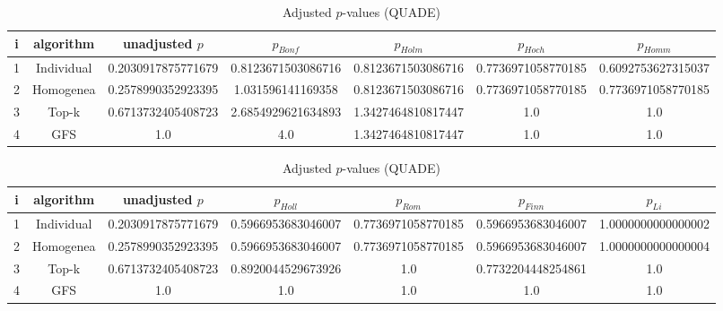 \documentclass[a4paper,10pt]{article}
\begin{document}
\begin{landscape}
\newpage

\begin{table}[!htp]
\centering\scriptsize
\caption{Adjusted $p$-values (QUADE)}
\begin{tabular}{ccccccc}
i&algorithm&unadjusted $p$&$p_{Bonf}$&$p_{Holm}$&$p_{Hoch}$&$p_{Homm}$\\
\hline
1&Individual&0.2030917875771679&0.8123671503086716&0.8123671503086716&0.7736971058770185&0.6092753627315037\\
2&Homogenea&0.2578990352923395&1.031596141169358&0.8123671503086716&0.7736971058770185&0.7736971058770185\\
3&Top-k&0.6713732405408723&2.6854929621634893&1.3427464810817447&1.0&1.0\\
4&GFS&1.0&4.0&1.3427464810817447&1.0&1.0\\
\hline
\end{tabular}
\end{table}

\begin{table}[!htp]
\centering\scriptsize
\caption{Adjusted $p$-values (QUADE)}
\begin{tabular}{ccccccc}
i&algorithm&unadjusted $p$&$p_{Holl}$&$p_{Rom}$&$p_{Finn}$&$p_{Li}$\\
\hline
1&Individual&0.2030917875771679&0.5966953683046007&0.7736971058770185&0.5966953683046007&1.0000000000000002\\
2&Homogenea&0.2578990352923395&0.5966953683046007&0.7736971058770185&0.5966953683046007&1.0000000000000004\\
3&Top-k&0.6713732405408723&0.8920044529673926&1.0&0.7732204448254861&1.0\\
4&GFS&1.0&1.0&1.0&1.0&1.0\\
\hline
\end{tabular}
\end{table}

\end{landscape}
\end{document}
